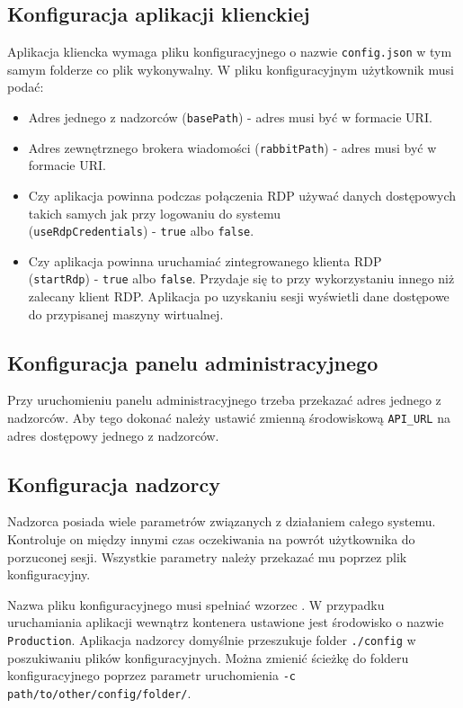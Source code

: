\documentclass[../opis-rozwiazania.tex]{subfiles}
\begin{document}
\subsection{Konfiguracja aplikacji klienckiej}
Aplikacja kliencka wymaga pliku konfiguracyjnego o nazwie \texttt{config.json} w tym samym folderze co plik wykonywalny.
W pliku konfiguracyjnym użytkownik musi podać:
\begin{itemize}
	\item Adres jednego z nadzorców (\texttt{basePath}) - adres musi być w formacie URI.
	\item Adres zewnętrznego brokera wiadomości (\texttt{rabbitPath}) - adres musi być w formacie URI.
	\item Czy aplikacja powinna podczas połączenia RDP używać danych dostępowych takich samych jak przy logowaniu do systemu \\(\texttt{useRdpCredentials}) - \texttt{true} albo \texttt{false}.
	\item Czy aplikacja powinna uruchamiać zintegrowanego klienta RDP \\(\texttt{startRdp}) - \texttt{true} albo \texttt{false}. Przydaje się to przy wykorzystaniu innego niż zalecany klient RDP. Aplikacja po uzyskaniu sesji wyświetli dane dostępowe do przypisanej maszyny wirtualnej.
\end{itemize}

\subsection{Konfiguracja panelu administracyjnego}
\label{system_startup.admin_panel_conf}
Przy uruchomieniu panelu administracyjnego trzeba przekazać adres jednego z nadzorców.
Aby tego dokonać należy ustawić zmienną środowiskową \texttt{API\_URL} na adres dostępowy jednego z nadzorców.

\subsection{Konfiguracja nadzorcy}
\label{system_startup.overseer_conf}
Nadzorca posiada wiele parametrów związanych z działaniem całego systemu.
Kontroluje on między innymi czas oczekiwania na powrót użytkownika do porzuconej sesji.
Wszystkie parametry należy przekazać mu poprzez plik konfiguracyjny.

Nazwa pliku konfiguracyjnego musi spełniać wzorzec \texttt{}.
W przypadku uruchamiania aplikacji wewnątrz kontenera ustawione jest środowisko o nazwie \texttt{Production}.
Aplikacja nadzorcy domyślnie przeszukuje folder \texttt{./config} w poszukiwaniu plików konfiguracyjnych.
Można zmienić ścieżkę do folderu konfiguracyjnego poprzez parametr uruchomienia \texttt{-c path/to/other/config/folder/}.
\end{document}
